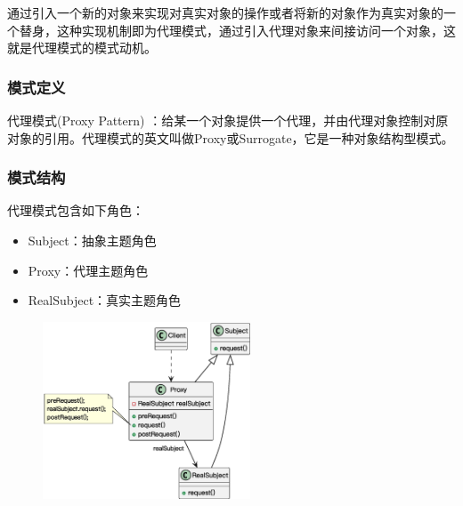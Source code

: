 通过引入一个新的对象来实现对真实对象的操作或者将新的对象作为真实对象的一个替身，这种实现机制即为代理模式，通过引入代理对象来间接访问一个对象，这就是代理模式的模式动机。

\subsubsection{模式定义}
代理模式(Proxy Pattern) ：给某一个对象提供一个代理，并由代理对象控制对原对象的引用。代理模式的英文叫做Proxy或Surrogate，它是一种对象结构型模式。

\subsubsection{模式结构}
代理模式包含如下角色：
\vspace{-0.8em}
\begin{multicols}{3}
    \begin{itemize}
        \item Subject：抽象主题角色
        \item Proxy：代理主题角色
        \item RealSubject：真实主题角色
    \end{itemize}
\end{multicols}
\vspace{-1em}

\begin{figure}[H]
    \vspace{-0.5em}
	\centering
	\includegraphics[width=0.55\textwidth]{images/代理模式结构.eps}
    \vspace{-1em}
\end{figure}


